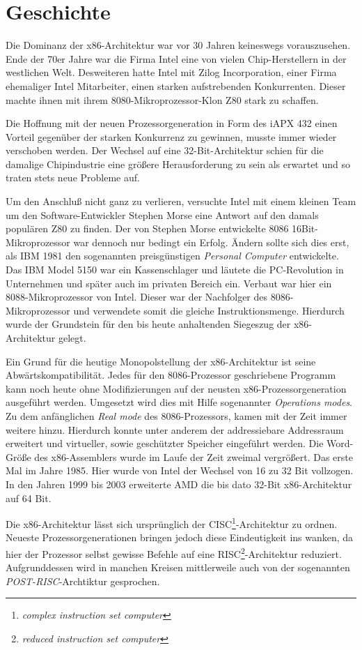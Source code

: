 \section{Geschichte}

Die Dominanz der x86-Architektur war vor 30 Jahren keineswegs vorauszusehen.
Ende der 70er Jahre war die Firma Intel eine von vielen Chip-Herstellern in der westlichen Welt.
Desweiteren hatte Intel mit Zilog Incorporation, einer Firma ehemaliger Intel Mitarbeiter, einen starken aufstrebenden Konkurrenten.
Dieser machte ihnen mit ihrem 8080-Mikroprozessor-Klon Z80 stark zu schaffen. 

Die Hoffnung mit der neuen Prozessorgeneration in Form des iAPX 432 einen Vorteil gegenüber der starken Konkurrenz zu gewinnen, musste immer wieder verschoben werden.
Der Wechsel auf eine 32-Bit-Architektur schien für die damalige Chipindustrie eine größere Herausforderung zu sein als erwartet und so traten stets neue Probleme auf.

Um den Anschluß nicht ganz zu verlieren, versuchte Intel mit einem kleinen Team um den Software-Entwickler Stephen Morse eine Antwort auf den damals populären Z80 zu finden.
Der von Stephen Morse entwickelte 8086 16Bit-Mikroprozessor war dennoch nur bedingt ein Erfolg.
Ändern sollte sich dies erst, als IBM 1981 den sogenannten preisgünstigen \textit{Personal Computer} entwickelte. Das IBM Model 5150 war ein Kassenschlager und läutete die PC-Revolution in Unternehmen und später auch im privaten Bereich ein.
Verbaut war hier ein 8088-Mikroprozessor von Intel. Dieser war der Nachfolger des 8086-Mikroprozessor und verwendete somit die gleiche Instruktionsmenge.
Hierdurch wurde der Grundstein für den bis heute anhaltenden Siegeszug der x86-Architektur gelegt.\cite{pcworld} 

Ein Grund für die heutige Monopolstellung der x86-Architektur ist seine Abwärtskompatibilität.
Jedes für den 8086-Prozessor geschriebene Programm kann noch heute ohne Modifizierungen auf der neusten x86-Prozessorgeneration ausgeführt werden.
Umgesetzt wird dies mit Hilfe sogenannter \textit{Operations modes}. Zu dem anfänglichen \textit{Real mode} des 8086-Prozessors, kamen mit der Zeit immer weitere hinzu.
Hierdurch konnte unter anderem der addressiebare Addressraum erweitert und virtueller, sowie geschützter Speicher eingeführt werden.
Die Word-Größe des x86-Assemblers wurde im Laufe der Zeit zweimal vergrößert. Das erste Mal im Jahre 1985. Hier wurde von Intel der Wechsel von 16 zu 32 Bit vollzogen. In den Jahren 1999 bis 2003 erweiterte AMD die bis dato 32-Bit x86-Architektur auf 64 Bit.

Die x86-Architektur lässt sich ursprünglich der CISC\footnote{\textit{complex instruction set computer}}-Architektur zu ordnen.
Neueste Prozessorgenerationen bringen jedoch diese Eindeutigkeit ins wanken, da hier der Prozessor selbst gewisse Befehle auf eine RISC\footnote{\textit{reduced instruction set computer}}-Architektur  reduziert.
Aufgrunddessen wird in manchen Kreisen mittlerweile auch von der sogenannten \textit{POST-RISC}-Archtiktur gesprochen.\cite{postrisc}
